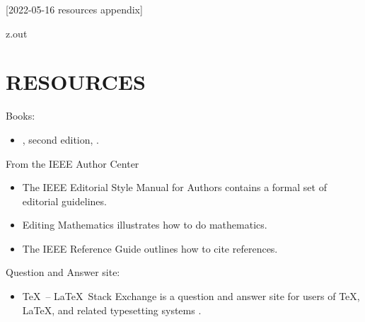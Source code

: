 [2022-05-16 resources appendix]

\begin{VerbatimOut}{z.out}
\chapter{RESOURCES}

Books:
\begin{itemize}
  \item
  , second edition, \cite{kottwitz2021}.
\end{itemize}
  
\noindent
From the
IEEE Author Center
\cite{ieee-author-center}
\begin{itemize}
  \item
    The
    IEEE Editorial Style Manual for Authors
    \cite{ieee-editorial-style-manual-for-authors}
    contains a formal set of editorial guidelines.
  \item
    Editing Mathematics
    \cite{editing-mathematics}
    illustrates how to do mathematics.
  \item
    The
    IEEE Reference Guide
    \cite{ieee-reference-guide}
    outlines how to cite references.
\end{itemize}

\noindent
Question and Answer site:
\begin{itemize}
  \item
    \TeX\ -- \LaTeX\ Stack Exchange
    is a question and answer site
    for users of
    \TeX,
    \LaTeX,
    and related typesetting systems
    \cite{tex-stackexchange}.
\end{itemize}
\end{VerbatimOut}

\MyIO
